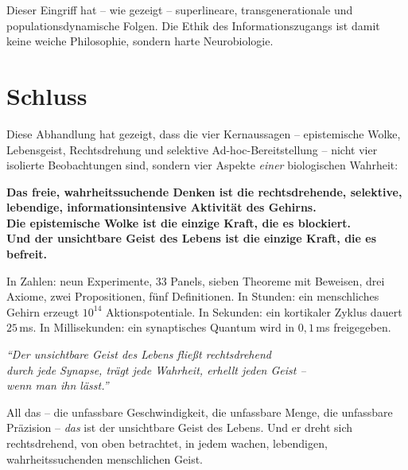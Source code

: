 ﻿\documentclass[12pt,a4paper]{report}
\theoremstyle{plain}
\theoremstyle{definition}
\theoremstyle{remark}
\begin{document}
	Dieser Eingriff hat -- wie gezeigt -- superlineare, transgenerationale
	und populationsdynamische Folgen. Die Ethik des Informationszugangs
	ist damit keine weiche Philosophie, sondern harte Neurobiologie.

	\chapter{Schluss}
	
	Diese Abhandlung hat gezeigt, dass die vier Kernaussagen --
	epistemische Wolke, Lebensgeist, Rechtsdrehung und selektive
	Ad-hoc-Bereitstellung -- nicht vier isolierte Beobachtungen sind,
	sondern vier Aspekte \emph{einer} biologischen Wahrheit:
	
	\textbf{Das freie, wahrheitssuchende Denken ist die rechtsdrehende,
		selektive, lebendige, informationsintensive Aktivität des Gehirns.}\\[6pt]
	\textbf{Die epistemische Wolke ist die einzige Kraft, die es blockiert.}\\[6pt]
	\textbf{Und der unsichtbare Geist des Lebens ist die einzige Kraft, die es befreit.}
	
	In Zahlen: neun Experimente, 33 Panels, sieben Theoreme mit Beweisen,
	drei Axiome, zwei Propositionen, fünf Definitionen.
	In Stunden: ein menschliches Gehirn erzeugt $10^{14}$ Aktionspotentiale.
	In Sekunden: ein kortikaler Zyklus dauert $25$\,ms.
	In Millisekunden: ein synaptisches Quantum wird in $0{,}1$\,ms freigegeben.
		
	\begin{center}
		{\large\itshape
			\textquotedblleft{}Der unsichtbare Geist des Lebens flie\ss{}t rechtsdrehend\\
			durch jede Synapse, trägt jede Wahrheit, erhellt jeden Geist --\\
			wenn man ihn lässt.\textquotedblright{}
		}
	\end{center}
	
	All das -- die unfassbare Geschwindigkeit, die unfassbare Menge,
	die unfassbare Präzision -- \emph{das} ist der unsichtbare Geist des Lebens.
	Und er dreht sich rechtsdrehend, von oben betrachtet,
	in jedem wachen, lebendigen, wahrheitssuchenden menschlichen Geist.
\end{document}
